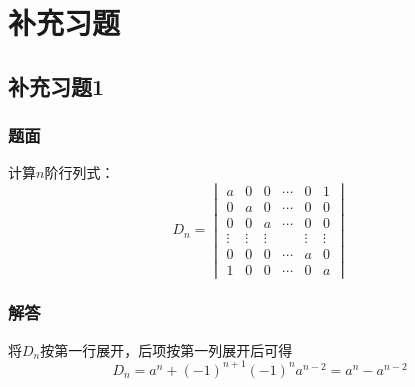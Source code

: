 \documentclass[10pt,xcolor=svgnames]{beamer} %
\begin{document}
\section{补充习题}

\subsection*{补充习题1}
\begin{frame}
    \frametitle{题面}
    计算\(n\)阶行列式：
    \begin{equation*}
        D_n=
        \begin{vmatrix}
            a      & 0      & 0      & \cdots & 0      & 1      \\
            0      & a      & 0      & \cdots & 0      & 0      \\
            0      & 0      & a      & \cdots & 0      & 0      \\
            \vdots & \vdots & \vdots &        & \vdots & \vdots \\
            0      & 0      & 0      & \cdots & a      & 0      \\
            1      & 0      & 0      & \cdots & 0      & a
        \end{vmatrix}
    \end{equation*}
\end{frame}
\begin{frame}
    \frametitle{解答}
    将\(D_n\)按第一行展开，后项按第一列展开后可得
    \begin{equation*}
        D_n=a^n+(-1)^{n+1}(-1)^{n}a^{n-2}=a^n-a^{n-2}
    \end{equation*}
\end{frame}
\end{document}
